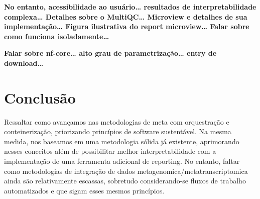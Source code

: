 \documentclass[
	12pt,				%
	oneside,			%
	a4paper,			%
	chapter=TITLE,		%
	section=TITLE,		%
	english,			%
	brazil				%
	]{abntex2}
\begin{document}
\textbf{No entanto, acessibilidade ao usuário\ldots{} resultados de interpretabilidade complexa\ldots{} Detalhes sobre o MultiQC\ldots{} Microview e detalhes de sua implementação\ldots{} Figura ilustrativa do report microview\ldots{} Falar sobre como funciona isoladamente\ldots{}}

\textbf{Falar sobre nf-core\ldots{} alto grau de parametrização\ldots{} entry de download\ldots{}}

\chapter{Conclusão}\label{conclusuxe3o}

Ressaltar como avançamos nas metodologias de meta com orquestração e conteinerização,
priorizando princípios de software sustentável. Na mesma medida, nos baseamos em uma metodologia
sólida já existente, aprimorando nesses conceitos além de possibilitar melhor interpretabilidade
com a implementação de uma ferramenta adicional de reporting.
No entanto, faltar como metodologias de integração de dados metagenomica/metatranscriptomica ainda
são relativamente escassas, sobretudo considerando-se fluxos de trabalho automatizados e que sigam esses mesmos princípios.

\postextual

\begingroup

\printbibliography[title=REFERÊNCIAS]

\endgroup


%
%

\end{document}
